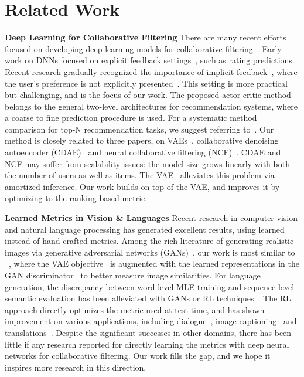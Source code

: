 \documentclass{article} \usepackage{iclr2020_conference,times}
\begin{document}
\section{Related Work}

{\bf Deep Learning for Collaborative Filtering}
There are many recent efforts focused on developing deep learning models for collaborative filtering~\citep{sedhain2015autorec,xue2017deep,he2018outer,he2018adversarial,zhang2017deep,chen2017attentive}. 
Early work on DNNs focused on explicit feedback settings~\citep{georgiev2013non,salakhutdinov2007restricted,zheng2016neural}, such as rating predictions. 
Recent research gradually recognized the importance of implicit feedback~\citep{wu2016collaborative,he2017neural,liang2018variational}, where the user's preference is not explicitly presented~\citep{hu2008collaborative}. This setting is more practical but challenging, and is the focus of our work.
The proposed actor-critic method belongs to the general two-level architectures for recommendation systems, where a coarse to fine prediction procedure is used. For a systematic method comparison for top-N recommendation tasks, we suggest referring to~\citet{dacrema2019we}.
Our method is closely related to three papers, on VAEs~\citep{liang2018variational}, collaborative denoising autoencoder (CDAE)~\citep{wu2016collaborative} and neural collaborative filtering (NCF)~\citep{he2017neural}.
CDAE and NCF may suffer from scalability issues: the model size grows linearly with both the number of users as well as items. The VAE~\citep{liang2018variational} alleviates this problem via amortized inference. 
Our work builds on top of the VAE, and improves it by optimizing to the ranking-based metric.




{\bf Learned Metrics in Vision \& Languages } Recent research in computer vision and natural language processing has generated excellent results, using learned instead of hand-crafted metrics. Among the rich literature of generating realistic images via generative adversarial networks (GANs)~\citep{goodfellow2014generative,radford2015unsupervised,karras2017progressive}, our work is most similar to ~\citet{larsen2016autoencoding}, where the VAE objective~\citep{kingma2013auto} is augmented with the learned representations in the GAN discriminator~\citep{goodfellow2014generative} to better measure image similarities. 
For language generation, the discrepancy between word-level MLE training and sequence-level semantic evaluation has been alleviated with GANs or RL techniques~\citep{bahdanau2016actor,ren2017deep,lin2017adversarial}. The RL approach directly optimizes the metric used at test time, 
and has shown improvement on various applications, including dialogue~\citep{li2016deep}, image captioning~\citep{rennie2017self} and translations~\citep{ranzato2015sequence}.
Despite the significant successes in other domains, there has been little if any research reported for directly learning the metrics with deep neural networks for collaborative filtering. Our work fills the gap, and we hope it inspires more research in this direction.
\end{document}
